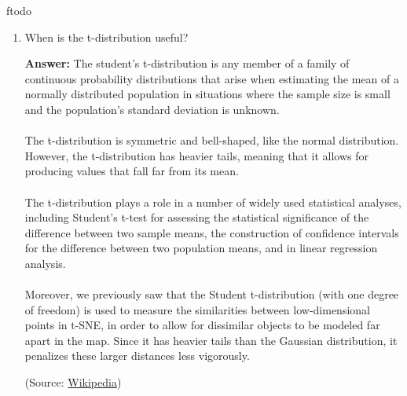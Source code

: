 ƒtodo\documentclass{article}
\newenvironment{QandA}{\begin{enumerate}[label=\arabic*.]}{\end{enumerate}}
\newenvironment{answer}{\par\normalfont \textbf{Answer:}}{}
\begin{document}
\begin{QandA}
    \item When is the t-distribution useful?
    \begin{answer}
        The student's t-distribution is any member of a family of continuous probability distributions that arise when estimating the mean of a normally distributed population in situations where the sample size is small and the population's standard deviation is unknown.\\\\
        The t-distribution is symmetric and bell-shaped, like the normal distribution. However, the t-distribution has heavier tails, meaning that it allows for producing values that fall far from its mean.\\\\
        The t-distribution plays a role in a number of widely used statistical analyses, including Student's t-test for assessing the statistical significance of the difference between two sample means, the construction of confidence intervals for the difference between two population means, and in linear regression analysis. \\\\
        Moreover, we previously saw that the Student t-distribution (with one degree of freedom) is used to measure the similarities between low-dimensional points in t-SNE, in order to allow for dissimilar objects to be modeled far apart in the map. Since it has heavier tails than the Gaussian distribution, it penalizes these larger distances less vigorously. 
        
        (Source: \href{https://en.wikipedia.org/wiki/Student%27s_t-distribution}{Wikipedia})
    \end{answer}
    

\end{QandA}
\end{document}
